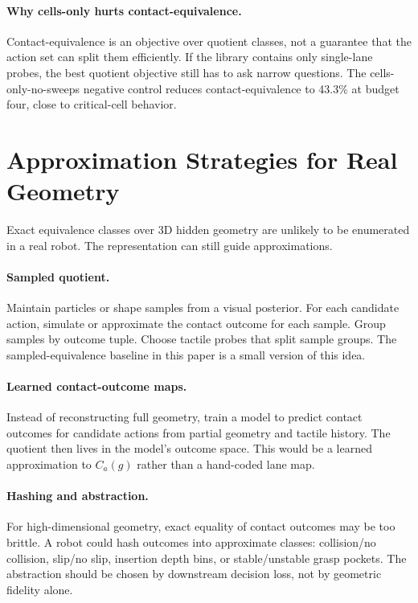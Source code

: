 \documentclass{article}
\begin{document}
\paragraph{Why cells-only hurts contact-equivalence.}
Contact-equivalence is an objective over quotient classes, not a guarantee that the action set can split them efficiently. If the library contains only single-lane probes, the best quotient objective still has to ask narrow questions. The cells-only-no-sweeps negative control reduces contact-equivalence to 43.3\% at budget four, close to critical-cell behavior.

\section{Approximation Strategies for Real Geometry}

Exact equivalence classes over 3D hidden geometry are unlikely to be enumerated in a real robot. The representation can still guide approximations.

\paragraph{Sampled quotient.}
Maintain particles or shape samples from a visual posterior. For each candidate action, simulate or approximate the contact outcome for each sample. Group samples by outcome tuple. Choose tactile probes that split sample groups. The sampled-equivalence baseline in this paper is a small version of this idea.

\paragraph{Learned contact-outcome maps.}
Instead of reconstructing full geometry, train a model to predict contact outcomes for candidate actions from partial geometry and tactile history. The quotient then lives in the model's outcome space. This would be a learned approximation to $C_a(g)$ rather than a hand-coded lane map.

\paragraph{Hashing and abstraction.}
For high-dimensional geometry, exact equality of contact outcomes may be too brittle. A robot could hash outcomes into approximate classes: collision/no collision, slip/no slip, insertion depth bins, or stable/unstable grasp pockets. The abstraction should be chosen by downstream decision loss, not by geometric fidelity alone.
\end{document}

